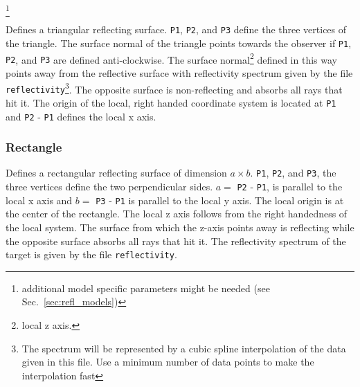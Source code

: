 \documentclass[10pt,a4paper,titlepage]{article}
\begin{document}


\footnote{additional model specific parameters might be needed (see Sec.~\ref{sec:refl_models})\label{fn:mparams}}

\vspace{0.25cm}
Defines a triangular reflecting surface. {\tt P1}, {\tt P2}, and {\tt P3} define the three vertices of the triangle. The surface normal of the triangle points towards the observer if {\tt P1}, {\tt P2}, and {\tt P3} are defined anti-clockwise. The surface normal\footnote{local z axis.} defined in this way points away from the reflective surface with reflectivity spectrum given by the file {\tt reflectivity}\footnote{The spectrum will be represented by a cubic spline interpolation of the data given in this file. Use a minimum number of data points to make the interpolation fast}. The opposite surface is non-reflecting and absorbs all rays that hit it. The origin of the local, right handed coordinate system is located at {\tt P1} and {\tt P2} - {\tt P1} defines the local x axis. 


\subsubsection{Rectangle}








\vspace{0.25cm}
Defines a rectangular reflecting surface of dimension $a \times b$. {\tt P1}, {\tt P2}, and {\tt P3}, the three vertices define the two perpendicular sides. $a=$ {\tt P2} - {\tt P1}, is parallel to the local x axis and $b=$ {\tt P3} - {\tt P1} is parallel to the local y axis. The local origin is at the center of the rectangle. The local z axis follows from the right handedness of the local system. The surface from which the z-axis points away is reflecting while the opposite surface absorbs all rays that hit it. The reflectivity spectrum of the target is given by the file {\tt reflectivity}.
\end{document}
